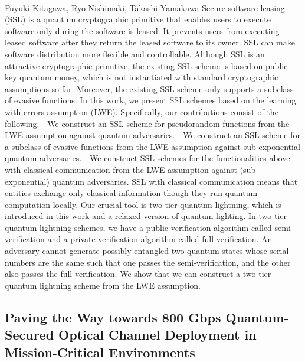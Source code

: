 \documentclass{article}%
\begin{document}
\paragraph{}%
Fuyuki Kitagawa, Ryo Nishimaki, Takashi Yamakawa%
Secure software leasing (SSL) is a quantum cryptographic primitive that enables users to execute software only during the software is leased. It prevents users from executing leased software after they return the leased software to its owner. SSL can make software distribution more flexible and controllable. Although SSL is an attractive cryptographic primitive, the existing SSL scheme is based on public key quantum money, which is not instantiated with standard cryptographic assumptions so far. Moreover, the existing SSL scheme only supports a subclass of evasive functions. In this work, we present SSL schemes based on the learning with errors assumption (LWE). Specifically, our contributions consist of the following.   - We construct an SSL scheme for pseudorandom functions from the LWE assumption against quantum adversaries.   - We construct an SSL scheme for a subclass of evasive functions from the LWE assumption against sub-exponential quantum adversaries.   - We construct SSL schemes for the functionalities above with classical communication from the LWE assumption against (sub-exponential) quantum adversaries. SSL with classical communication means that entities exchange only classical information though they run quantum computation locally.   Our crucial tool is two-tier quantum lightning, which is introduced in this work and a relaxed version of quantum lighting. In two-tier quantum lightning schemes, we have a public verification algorithm called semi-verification and a private verification algorithm called full-verification. An adversary cannot generate possibly entangled two quantum states whose serial numbers are the same such that one passes the semi-verification, and the other also passes the full-verification. We show that we can construct a two-tier quantum lightning scheme from the LWE assumption.

%
\subsection{Paving the Way towards 800 Gbps Quantum-Secured Optical Channel   Deployment in Mission-Critical Environments}%
\label{subsec:PavingtheWaytowards800GbpsQuantum{-}SecuredOpticalChannelDeploymentinMission{-}CriticalEnvironments}%
\end{document}
